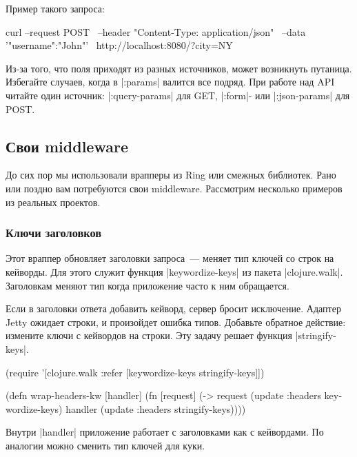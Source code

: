 \noindent
Пример такого запроса:

\begin{english}
  \begin{bash}
curl --request POST \
     --header "Content-Type: application/json" \
     --data '{"username":"John"}' \
     http://localhost:8080/?city=NY
  \end{bash}
\end{english}

Из-за того, что поля приходят из разных источников, может возникнуть
путаница. Избегайте случаев, когда в \spverb|:params| валится все подряд. При
работе над API читайте один источник: \spverb|:query-params| для GET,
\spverb|:form|- или \spverb|:json-params| для POST.

\subsection{Свои middleware}

До сих пор мы использовали врапперы из Ring или смежных библиотек. Рано или
поздно вам потребуются свои middleware. Рассмотрим несколько примеров из
реальных проектов.

\subsubsection*{Ключи заголовков}

Этот враппер обновляет заголовки запроса~--- меняет тип ключей со строк на
кейворды. Для этого служит функция \spverb|keywordize-keys| из пакета
\spverb|clojure.walk|. Заголовкам меняют тип когда приложение часто к ним
обращается.

Если в заголовки ответа добавить кейворд, сервер бросит исключение. Адаптер
Jetty ожидает строки, и произойдет ошибка типов. Добавьте обратное действие:
измените ключи с кейвордов на строки. Эту задачу решает функция
\spverb|stringify-keys|.

\begin{english}
  \begin{clojure}
(require '[clojure.walk :refer
           [keywordize-keys stringify-keys]])

(defn wrap-headers-kw [handler]
  (fn [request]
    (-> request
        (update :headers keywordize-keys)
        handler
        (update :headers stringify-keys))))
  \end{clojure}
\end{english}

Внутри \spverb|handler| приложение работает с заголовками как с кейвордами. По
аналогии можно сменить тип ключей для куки.

